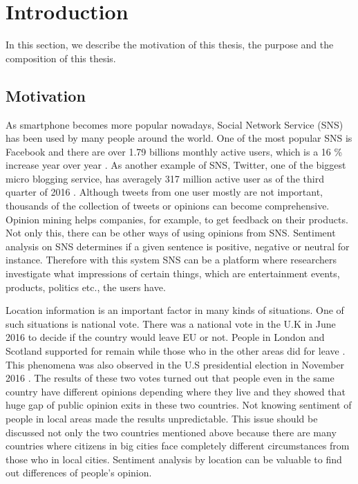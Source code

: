 \chapter{Introduction}
In this section, we describe the motivation of this thesis, the purpose and the composition of this thesis.

\section{Motivation} \label{sec:motivation}
As smartphone becomes more popular nowadays, Social Network Service (SNS) has been used by many people around the world.
One of the most popular SNS is Facebook and there are over 1.79 billions monthly active users, which is a 16 \% increase year over year \cite{facebook_user}.
As another example of SNS, Twitter, one of the biggest micro blogging service, has averagely 317 million active user as of the third quarter of 2016 \cite{twitter_user}.
Although tweets from one user mostly are not important, thousands of the collection of tweets or opinions can become comprehensive.
Opinion mining helps companies, for example, to get feedback on their products.
Not only this, there can be other ways of using opinions from SNS.
Sentiment analysis on SNS determines if a given sentence is positive, negative or neutral for instance.
Therefore with this system SNS can be a platform where researchers investigate what impressions of certain things, which are entertainment events, products, politics etc., the users have.


Location information is an important factor in many kinds of situations.
One of such situations is national vote.
There was a national vote in the U.K in June 2016 to decide if the country would leave EU or not.
People in London and Scotland supported for remain while those who in the other areas did for leave \cite{uk_referendum}.
This phenomena was also observed in the U.S presidential election in November 2016 \cite{us_map}.
The results of these two votes turned out that people even in the same country have different opinions depending where they live and they showed that huge gap of public opinion exits in these two countries.
Not knowing sentiment of people in local areas made the results unpredictable.
This issue should be discussed not only the two countries mentioned above because there are many countries where citizens in big cities face completely different circumstances from those who in local cities.
Sentiment analysis by location can be valuable to find out differences of people's opinion. 

